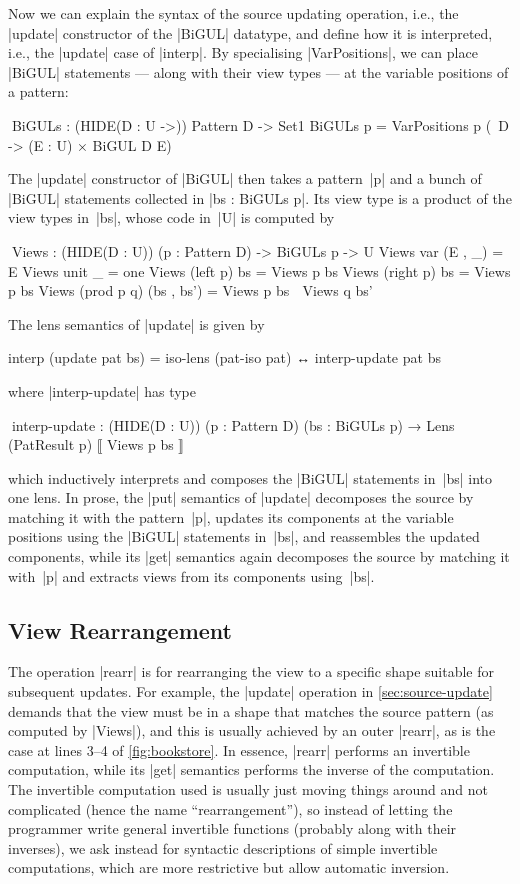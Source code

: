 \documentclass{sigplanconf}
\begin{document}
Now we can explain the syntax of the source updating operation, i.e., the |update| constructor of the |BiGUL| datatype, and define how it is interpreted, i.e., the |update| case of |interp|.
By specialising |VarPositions|, we can place |BiGUL| statements --- along with their view types --- at the variable positions of a pattern:
\begin{code}
^^^BiGULs : (HIDE({D : U} ->)) Pattern D -> Set1
BiGULs p = VarPositions p (\ D -> (E : U) × BiGUL D E)
\end{code}
The |update| constructor of |BiGUL| then takes a pattern~|p| and a bunch of |BiGUL| statements collected in |bs : BiGULs p|.
Its view type is a product of the view types in~|bs|, whose code in~|U| is computed by
\begin{code}
^^^Views : (HIDE({D : U})) (p : Pattern D) -> BiGULs p -> U
Views var         (E , _)     = E
Views unit        _           = one
Views (left   p)  bs          = Views p bs
Views (right  p)  bs          = Views p bs
Views (prod p q)  (bs , bs')  = Views p bs ⊗ Views q bs'
\end{code}
The lens semantics of |update| is given by
\begin{code}
interp (update pat bs) =
  iso-lens (pat-iso pat) ↔ interp-update pat bs
\end{code}
where |interp-update| has type
\begin{code}
^^^interp-update :  (HIDE({D : U})) (p : Pattern D) (bs : BiGULs p) →
                    Lens (PatResult p) ⟦ Views p bs ⟧
\end{code}
which inductively interprets and composes the |BiGUL| statements in~|bs| into one lens.
In prose, the |put| semantics of |update| decomposes the source by matching it with the pattern~|p|, updates its components at the variable positions using the |BiGUL| statements in~|bs|, and reassembles the updated components, while its |get| semantics again decomposes the source by matching it with~|p| and extracts views from its components using~|bs|.

\subsection{View Rearrangement}
\label{sec:view-rearrangement}

The operation |rearr| is for rearranging the view to a specific shape suitable for subsequent updates.
For example, the |update| operation in \autoref{sec:source-update} demands that the view must be in a shape that matches the source pattern (as computed by |Views|), and this is usually achieved by an outer |rearr|, as is the case at lines 3--4 of \autoref{fig:bookstore}.
In essence, |rearr| performs an invertible computation, while its |get| semantics performs the inverse of the computation.
The invertible computation used is usually just moving things around and not complicated (hence the name ``rearrangement''), so instead of letting the programmer write general invertible functions (probably along with their inverses), we ask instead for syntactic descriptions of simple invertible computations, which are more restrictive but allow automatic inversion.
\end{document}
